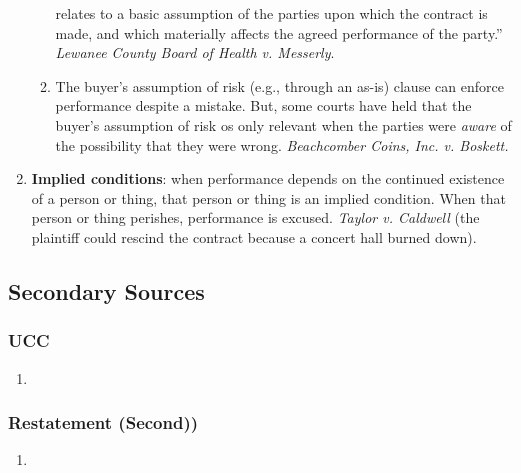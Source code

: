 \begin{enumerate}
\begin{enumerate}
        relates to a basic assumption of the parties upon which the contract 
        is made, and which materially affects the agreed performance of the 
        party.'' \emph{Lewanee County Board of Health v. Messerly}.
        \item The buyer's assumption of risk (e.g., through an as-is) clause 
        can enforce performance despite a mistake. But, some courts have held 
        that the buyer's assumption of risk os only relevant when the parties 
        were \emph{aware} of the possibility that they were wrong. 
        \emph{Beachcomber Coins, Inc. v. Boskett.}
    \end{enumerate}
    \item \textbf{Implied conditions}: when performance depends on the 
    continued existence of a person or thing, that person or thing is an 
    implied condition. When that person or thing perishes, performance is 
    excused. \emph{Taylor v. Caldwell} (the plaintiff could rescind the 
    contract because a concert hall burned down).
\end{enumerate}

\subsection{Secondary Sources}


\subsubsection{UCC}

\begin{enumerate}
    \item %
\end{enumerate}

\subsubsection{Restatement (Second))}

\begin{enumerate}
    \item %
\end{enumerate}
